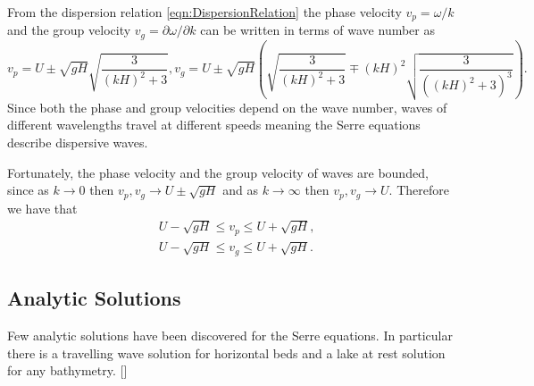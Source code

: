 From the dispersion relation \eqref{eqn:DispersionRelation} the phase velocity $v_p = \omega / k$  and the group velocity $v_g = \partial \omega / \partial  k$ can be written in terms of wave number as
\begin{subequations}
	\label{eqn:WaveVelocities}
	\begin{equation}
	\label{eqn:WaveVelocitiesPhase}
	v_p = U \pm \sqrt{gH}\sqrt{\frac{3}{\left(kH\right)^2 + 3}},
	\end{equation}
	\begin{equation}
	\label{eqn:WaveVelocitiesGroup}
	v_g = U \pm \sqrt{gH} \left(\sqrt{\frac{3}{\left(kH\right)^2 + 3}} \mp \left(kH\right)^2 \sqrt{\frac{3}{\left(\left(kH\right)^2 + 3 \right)^3}}\right).
	\end{equation}
\end{subequations}
Since both the phase and group velocities depend on the wave number, waves of different wavelengths travel at different speeds meaning the Serre equations describe dispersive waves.

Fortunately, the phase velocity and the group velocity of waves are bounded, since as $k \rightarrow 0$ then $v_p,v_g \rightarrow U \pm \sqrt{gH}$ and as $k \rightarrow \infty$ then  $v_p,v_g \rightarrow U$. Therefore we have that
\begin{subequations}
\begin{align}
&U - \sqrt{gH} \le v_p \le U + \sqrt{gH}, \label{eqn:WaveVelocitiesBound} \\
&U - \sqrt{gH} \le v_g \le U + \sqrt{gH}.
\end{align}
\end{subequations}

\subsection{Analytic Solutions}
Few analytic solutions have been discovered for the Serre equations. In particular there is a travelling wave solution for horizontal beds and a lake at rest solution for any bathymetry.
[]

